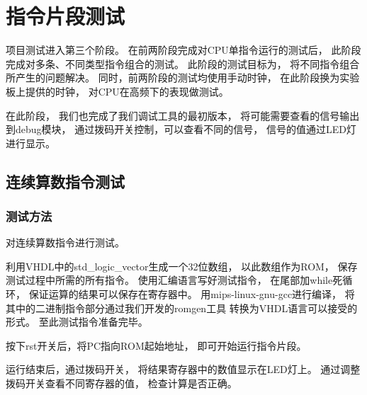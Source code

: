 \section{指令片段测试}

    项目测试进入第三个阶段。%
    在前两阶段完成对CPU单指令运行的测试后，%
    此阶段完成对多条、不同类型指令组合的测试。%
    此阶段的测试目标为，%
    将不同指令组合所产生的问题解决。%
    同时，前两阶段的测试均使用手动时钟，%
    在此阶段换为实验板上提供的时钟，%
    对CPU在高频下的表现做测试。

    在此阶段，%
    我们也完成了我们调试工具的最初版本，%
    将可能需要查看的信号输出到debug模块，%
    通过拨码开关控制，可以查看不同的信号，%
    信号的值通过LED灯进行显示。

    \subsection{连续算数指令测试}
        \subsubsection{测试方法}
            对连续算数指令进行测试。%

            利用VHDL中的std\_logic\_vector生成一个32位数组，%
            以此数组作为ROM，%
            保存测试过程中所需的所有指令。%
            使用汇编语言写好测试指令，%
            在尾部加while死循环，%
            保证运算的结果可以保存在寄存器中。%
            用mips-linux-gnu-gcc进行编译，%
            将其中的二进制指令部分通过我们开发的romgen工具%
            转换为VHDL语言可以接受的形式。%
            至此测试指令准备完毕。

            按下rst开关后，将PC指向ROM起始地址，%
            即可开始运行指令片段。%

            运行结束后，通过拨码开关，%
            将结果寄存器中的数值显示在LED灯上。%
            通过调整拨码开关查看不同寄存器的值，%
            检查计算是否正确。

